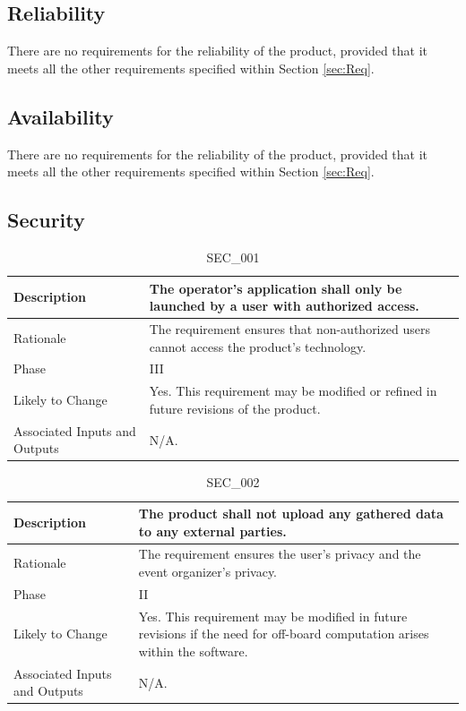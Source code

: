\documentclass{article}
\begin{document}
\subsection{Reliability }
There are no requirements for the reliability of the product, provided that it meets all the other requirements specified within Section \ref{sec:Req}.

\subsection{Availability}
There are no requirements for the reliability of the product, provided that it meets all the other requirements specified within Section \ref{sec:Req}.

\subsection{Security}
\begin{table}[!h]
\begin{center}
\caption {SEC\_001} 
\label{SEC_001}
\begin{tabular}{ | m{3cm} | m{11cm} | }
\hline
Description & The operator's application shall only be launched by a user with authorized access. \\
\hline
Rationale & The requirement ensures that non-authorized users cannot access the product's technology. \\
\hline
Phase & III \\
\hline
Likely to Change & Yes. This requirement may be modified or refined in future revisions of the product. \\
\hline
Associated Inputs and Outputs & N/A.  \\
\hline
\end{tabular}
\end{center}
\end{table}

\begin{table}[!h]
\begin{center}
\caption {SEC\_002} 
\label{SEC_002}
\begin{tabular}{ | m{3cm} | m{11cm} | }
\hline
Description & The product shall not upload any gathered data to any external parties. \\
\hline
Rationale & The requirement ensures the user's privacy and the event organizer's privacy. \\
\hline
Phase & II \\
\hline
Likely to Change & Yes. This requirement may be modified in future revisions if the need for off-board computation arises within the software. \\
\hline
Associated Inputs and Outputs & N/A.  \\
\hline
\end{tabular}
\end{center}
\end{table}
\end{document}
